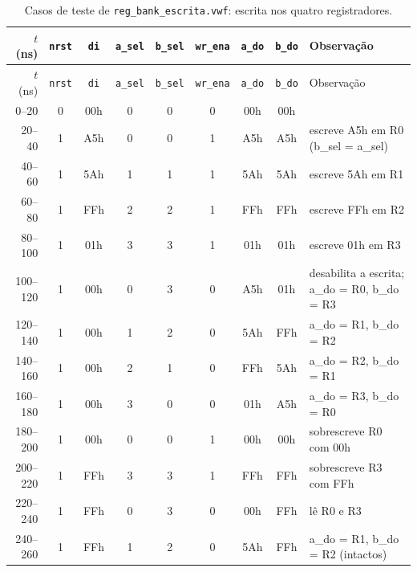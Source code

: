 {\scriptsize\setlength{\tabcolsep}{3pt}
\begin{longtable}{rcccccccp{5.3cm}}
\caption{Casos de teste de \texttt{reg\_bank\_escrita.vwf}: escrita nos quatro registradores.}
\label{tab:caso-reg-bank-escrita}\\
\hline $t$ (ns) & \texttt{nrst} & \texttt{di} & \texttt{a\_sel} & \texttt{b\_sel} & \texttt{wr\_ena} & \texttt{a\_do} & \texttt{b\_do} & Observação \\ \hline \endfirsthead
\hline $t$ (ns) & \texttt{nrst} & \texttt{di} & \texttt{a\_sel} & \texttt{b\_sel} & \texttt{wr\_ena} & \texttt{a\_do} & \texttt{b\_do} & Observação \\ \hline \endhead
0--20 & 0 & 00h & 0 & 0 & 0 & 00h & 00h &  \\
20--40 & 1 & A5h & 0 & 0 & 1 & A5h & A5h & escreve A5h em R0 (b\_sel = a\_sel) \\
40--60 & 1 & 5Ah & 1 & 1 & 1 & 5Ah & 5Ah & escreve 5Ah em R1 \\
60--80 & 1 & FFh & 2 & 2 & 1 & FFh & FFh & escreve FFh em R2 \\
80--100 & 1 & 01h & 3 & 3 & 1 & 01h & 01h & escreve 01h em R3 \\
100--120 & 1 & 00h & 0 & 3 & 0 & A5h & 01h & desabilita a escrita; a\_do = R0, b\_do = R3 \\
120--140 & 1 & 00h & 1 & 2 & 0 & 5Ah & FFh & a\_do = R1, b\_do = R2 \\
140--160 & 1 & 00h & 2 & 1 & 0 & FFh & 5Ah & a\_do = R2, b\_do = R1 \\
160--180 & 1 & 00h & 3 & 0 & 0 & 01h & A5h & a\_do = R3, b\_do = R0 \\
180--200 & 1 & 00h & 0 & 0 & 1 & 00h & 00h & sobrescreve R0 com 00h \\
200--220 & 1 & FFh & 3 & 3 & 1 & FFh & FFh & sobrescreve R3 com FFh \\
220--240 & 1 & FFh & 0 & 3 & 0 & 00h & FFh & lê R0 e R3 \\
240--260 & 1 & FFh & 1 & 2 & 0 & 5Ah & FFh & a\_do = R1, b\_do = R2 (intactos) \\
\hline
\end{longtable}}
\vspace{-0.9cm}
